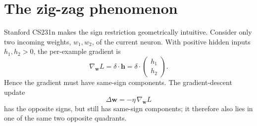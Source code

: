 \documentclass[11pt]{article}
\begin{document}
\section{The zig-zag phenomenon}

Stanford CS231n makes the sign restriction geometrically intuitive.  Consider only two incoming weights, \(w_1,w_2\), of the current neuron.  With positive hidden inputs \(h_1,h_2>0\), the per-example gradient is
\[
  \nabla_{\mathbf w}L
  =\delta\cdot\mathbf h
  =\delta\cdot
  \begin{pmatrix}h_1\\h_2\end{pmatrix}.
\]
Hence the gradient must have same-sign components.  The gradient-descent update
\[
  \Delta\mathbf w=-\eta\,\nabla_{\mathbf w}L
\]
has the opposite signs, but still has same-sign components; it therefore also lies in one of the same two opposite quadrants.
\end{document}
